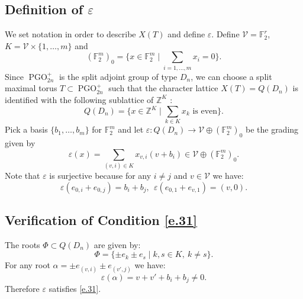 \documentclass[12pt]{amsart}
\numberwithin{equation}{section}
\theoremstyle{definition}
\newcommand{\cV}{\mathcal{V}}
\newcommand{\bF}{\mathbb{F}}
\newcommand{\bZ}{\mathbb{Z}}
\newcommand{\PGO}{\operatorname{PGO}}
\newcommand{\eps}{\varepsilon}
\begin{document}
\subsection*{Definition of \texorpdfstring{$\eps$}{epsilon}}

We set notation in order to describe $X(T)$ and define $\eps$. Define $\cV=\bF_2^{r}$, $K = \cV \times \{1,\dots,m\}$ and
$$ (\bF_2^{m})_0 = \{ x \in \bF_2^m \mid \sum_{i=1,\dots,m} x_i =0\}.$$
Since $\PGO^+_{2n}$ is the split adjoint group of type $D_n$, we can choose a split maximal torus $T\subset \PGO^+_{2n}$ such that the character lattice $X(T)=Q(D_n)$ is identified with the following sublattice of $\bZ^{K}$ \cite[Section 7.1]{conway2013sphere}:
$$Q(D_n) = \{ x\in \bZ^K \mid  \sum_{k\in K} x_k \text{ is even}\}.$$
Pick a basis $\{b_1,\dots,b_m\}$ for $\bF_2^{m}$ and let $\eps: Q(D_{n}) \to \cV\oplus (\bF_2^{m})_0$ be the grading given by $$\eps(x) = \sum_{(v,i)\in K} x_{v,i}(v + b_i)\in \cV\oplus (\bF_2^{m})_0.$$ 
Note that $\eps$ is surjective because for any $i\neq j$ and $v\in \cV$ we have: $$\eps(e_{0,i}+e_{0,j}) =b_i+b_j, \ \ \eps(e_{0,1}+e_{v,1}) = (v,0).$$

\subsection*{Verification of Condition \eqref{e.31}}

    The roots $\Phi \subset Q(D_{n})$ are given by:
$$\Phi = \{ \pm e_k \pm e_s \mid k,s\in K, \  k\neq s \}. $$
   For any root $\alpha = \pm e_{(v,i)} \pm e_{(v',j)}$ we have:
    $$\eps(\alpha) =  v+v'+ b_i+b_j \neq 0.$$
Therefore $\eps$ satisfies \eqref{e.31}.
\end{document}
